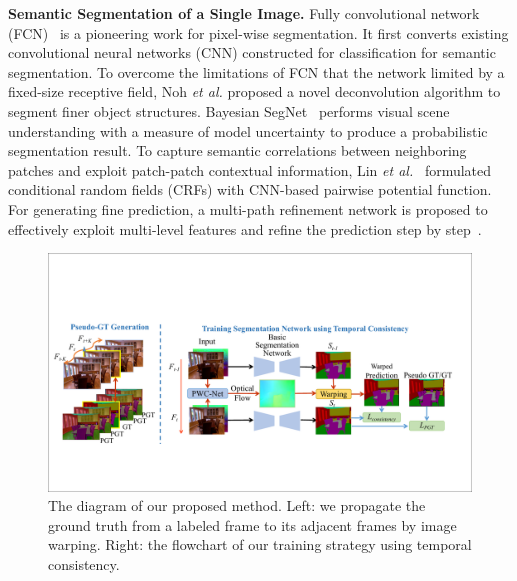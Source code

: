 \noindent \textbf{Semantic Segmentation of a Single Image.}
%
Fully convolutional network (FCN)~\cite{Long2015} is a pioneering work for pixel-wise segmentation. It first converts existing convolutional neural networks (CNN) constructed for classification for semantic segmentation.
%
To overcome the limitations of FCN that the network limited by a fixed-size receptive field, Noh \emph{et al.} \cite{Noh2015} proposed a novel deconvolution algorithm to segment finer object structures.
%
Bayesian SegNet~\cite{Kendall2015} performs visual scene understanding with a measure of model uncertainty to produce a probabilistic segmentation result.
%
To capture semantic correlations between neighboring patches and exploit patch-patch contextual information, Lin \emph{et al.}~\cite{Lin2016} formulated conditional random fields (CRFs) with CNN-based pairwise potential function. 
%
For generating fine prediction, a multi-path refinement network is proposed to effectively exploit multi-level features and refine the prediction step by step~\cite{Lin2017}.
%


\begin{figure}[htbp]
	\setlength{\abovecaptionskip}{0pt} 
	\setlength{\belowcaptionskip}{10pt}
	\centering
	\centering
	\includegraphics[scale=0.56]{figure/Pipeline.pdf}
	\caption{The diagram of our proposed method. Left: we propagate the ground truth from a labeled frame to its adjacent frames by image warping. Right: the flowchart of our training strategy using temporal consistency. 
		}
	\label{fig:Pipeline}
	\vspace*{-0.2cm}
\end{figure}
 

